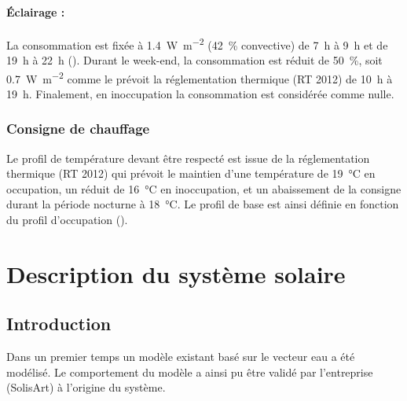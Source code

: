 \paragraph{Éclairage :} %
\label{par:eclairage}
La consommation est fixée à \SI{1.4}{\watt\per m^{2}} (\SI{42}{\percent}
convective) de \SI{7}{\hour} à \SI{9}{\hour} et de \SI{19}{\hour} à \SI{22}{\hour}
(). Durant le week-end, la consommation est réduit de \SI{50}{\percent},
soit
\SI{0.7}{\watt\per m^{2}} comme le prévoit la réglementation thermique (RT 2012)
de \SI{10}{\hour} à \SI{19}{\hour}. Finalement, en inoccupation la consommation est
considérée comme nulle.



\subsubsection{Consigne de chauffage} %
\label{ssub:consigne_de_chauffage}
Le profil de température devant être respecté est issue de la réglementation thermique (RT
2012) qui prévoit le maintien d’une température de \SI{19}{\celsius} en occupation, un
réduit de \SI{16}{\celsius} en inoccupation, et un abaissement de la consigne durant la
période nocturne à \SI{18}{\celsius}. Le profil de base est ainsi définie en fonction du
profil d’occupation ().



\section{Description du système solaire} %
\label{sec:description_du_système_solaire}
\subsection{Introduction} %
\label{sub:introduction}

Dans un premier temps un modèle existant basé sur le vecteur eau a été modélisé.
Le comportement du modèle a ainsi pu être validé par l’entreprise (SolisArt) à
l’origine du système.

